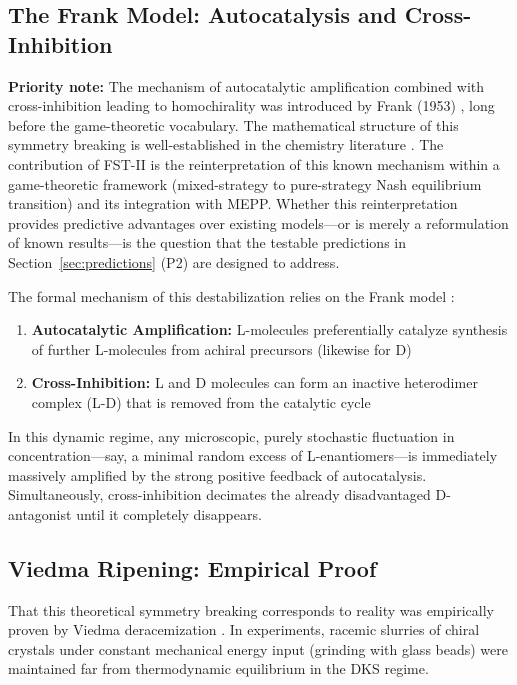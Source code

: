 \documentclass[12pt,a4paper]{article}
\theoremstyle{remark}
\begin{document}
\subsection{The Frank Model: Autocatalysis and Cross-Inhibition}

\textbf{Priority note:} The mechanism of autocatalytic amplification combined with cross-inhibition leading to homochirality was introduced by Frank (1953) \citep{Frank1953}, long before the game-theoretic vocabulary. The mathematical structure of this symmetry breaking is well-established in the chemistry literature \citep{SchmitzReview2011}. The contribution of FST-II is the reinterpretation of this known mechanism within a game-theoretic framework (mixed-strategy to pure-strategy Nash equilibrium transition) and its integration with MEPP. Whether this reinterpretation provides predictive advantages over existing models---or is merely a reformulation of known results---is the question that the testable predictions in Section~\ref{sec:predictions} (P2) are designed to address.

The formal mechanism of this destabilization relies on the Frank model \citep{Frank1953}:
\begin{enumerate}
    \item \textbf{Autocatalytic Amplification:} L-molecules preferentially catalyze synthesis of further L-molecules from achiral precursors (likewise for D)
    \item \textbf{Cross-Inhibition:} L and D molecules can form an inactive heterodimer complex (L-D) that is removed from the catalytic cycle \citep{Biochirality}
\end{enumerate}

In this dynamic regime, any microscopic, purely stochastic fluctuation in concentration---say, a minimal random excess of L-enantiomers---is immediately massively amplified by the strong positive feedback of autocatalysis. Simultaneously, cross-inhibition decimates the already disadvantaged D-antagonist until it completely disappears.

\subsection{Viedma Ripening: Empirical Proof}

That this theoretical symmetry breaking corresponds to reality was empirically proven by Viedma deracemization \citep{HomochiralityThermo}. In experiments, racemic slurries of chiral crystals under constant mechanical energy input (grinding with glass beads) were maintained far from thermodynamic equilibrium in the DKS regime.
\end{document}
